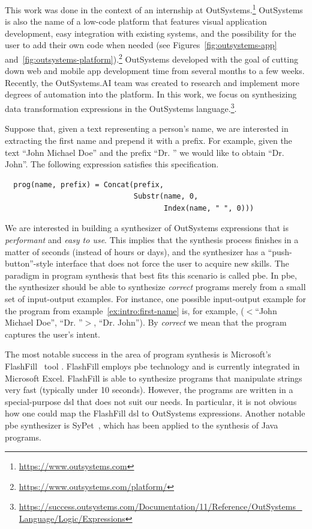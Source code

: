 This work was done in the context of an internship at
OutSystems.\footnote{\url{https://www.outsystems.com}}
OutSystems is also the name of a low-code platform that features visual
application development, easy integration with existing systems, and the
possibility for the user to add their own code when needed (see
Figures~\ref{fig:outsystems-app} and~\ref{fig:outsystems-platform}).\footnote{\url{https://www.outsystems.com/platform/}}
OutSystems developed with the goal of cutting down web and mobile app
development time from several months to a few weeks.
Recently, the OutSystems.AI team was created to research and implement more
degrees of automation into the platform.
In this work, we focus on synthesizing data transformation expressions in the
OutSystems language.\footnote{\url{https://success.outsystems.com/Documentation/11/Reference/OutSystems_Language/Logic/Expressions}}.

\begin{example}\label{ex:intro:first-name}
  Suppose that, given a text representing a person's name, we are interested in
extracting the first name and prepend it with a prefix. For example, given the
text ``John Michael Doe'' and the prefix ``Dr. '' we would like to obtain
``Dr. John''. The following expression satisfies this specification.
 
\begin{lstlisting}
  prog(name, prefix) = Concat(prefix,
                              Substr(name, 0,
                                     Index(name, " ", 0)))
\end{lstlisting}
\end{example}

\noindent
We are interested in building a synthesizer of OutSystems expressions that is
\textit{performant} and \textit{easy to use}.
This implies that the synthesis process finishes in a matter of seconds
(instead of hours or days), and the synthesizer has a ``push-button''-style
interface that does not force the user to acquire new skills.
The paradigm in program synthesis that best fits this scenario is called
\gls{pbe}.
In \gls{pbe}, the synthesizer should be able to synthesize \textit{correct}
programs merely from a small set of input-output examples.
For instance, one possible input-output example for the program from
example~\ref{ex:intro:first-name} is, for example, ($<$``John Michael Doe'', ``Dr.
''$>$, ``Dr. John'').
By \textit{correct} we mean that the program captures the user's intent.

The most notable success in the area of program synthesis is Microsoft's
FlashFill~\cite{Gulwani:2011} tool .
FlashFill employs \gls{pbe} technology and is currently integrated in Microsoft
Excel.
FlashFill is able to synthesize programs that manipulate strings very fast
(typically under 10 seconds).
However, the programs are written in a special-purpose \gls{dsl} that does not
suit our needs.
In particular, it is not obvious how one could map the FlashFill \gls{dsl} to
OutSystems expressions.
Another notable \gls{pbe} synthesizer is SyPet~\cite{Feng:2017:CSC}, which has
been applied to the synthesis of Java programs.

